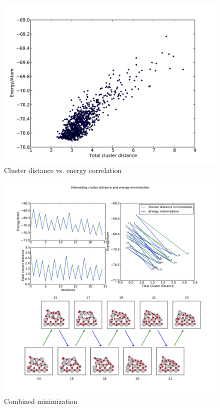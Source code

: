 \documentclass[%
 aps,
 prl,%
 amsmath,amssymb,
 reprint,%
]{revtex4-1}
\begin{document}
\begin{figure}[h]
    \centering
    \includegraphics[width=1.0\columnwidth]{decoorL2_5_fgen_Ti13O26Ridge_9_11_9_1510066208.pdf}
    \caption{Cluster distance vs. energy correlation}
    \label{fig:fig2}
\end{figure}




\begin{figure}[h]
    \centering
    \includegraphics[width=2.0\columnwidth]{acdminplot_74_98_ridgemin2_5_9_500_Ti13O26Ridge.pdf}
    \caption{Combined minimization}
    \label{fig:fig3}
\end{figure}
\end{document}
